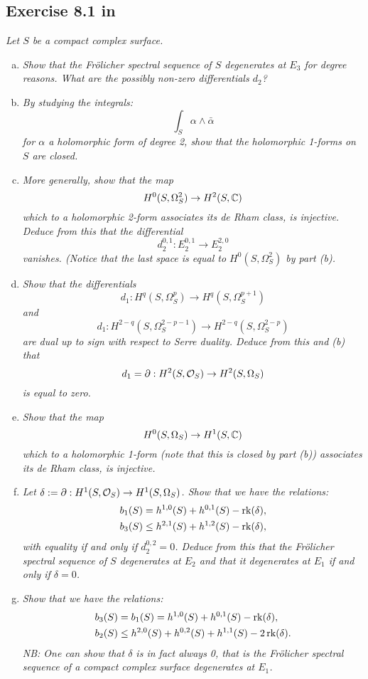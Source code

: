 \documentclass{article}
\begin{document}
\subsection*{Exercise 8.1 in \cite{Voi1}}
\emph{Let $S$ be a compact complex surface.}
\begin{enumerate}[(a)]
\item \emph{Show that the Fr\"olicher spectral sequence of $S$ degenerates at $E_3$ for degree reasons. What are
the possibly non-zero differentials $d_2$?}
\item \emph{By studying the integrals:}
\[	\int_S \alpha \wedge \bar \alpha	\]
\emph{for $\alpha$ a holomorphic form of degree 2, show that the holomorphic 1-forms on $S$ are closed.}
\item \emph{More generally, show that the map}
\[	H^0(S,\Omega^2_S) \to H^2(S,\mathbb{C})	\]
\emph{which to a holomorphic 2-form associates its de Rham class, is injective. Deduce from this that the 
differential}
\[	d_2^{0,1} : E_2^{0,1} \to E_{2}^{2,0}	\]
\emph{vanishes. (Notice that the last space is equal to $H^0(S, \Omega^2_S)$ by part (b).}
\item \emph{Show that the differentials}
\[	d_1 : H^q(S,\Omega_S^p) \to H^q(S,\Omega_S^{p+1})	\]
\emph{and}
\[	d_1 : H^{2-q}(S,\Omega_S^{2-p-1}) \to H^{2-q}(S,\Omega_S^{2-p})	\]
\emph{are dual up to sign with respect to Serre duality. Deduce from this and (b) that}
\[	d_1 = \partial : H^2(S,\mathcal{O}_S) \to H^2(S,\Omega_S)	\]
\emph{is equal to zero.}
\item \emph{Show that the map}
\[	H^0(S,\Omega_S) \to H^1(S,\mathbb{C})	\]
\emph{which to a holomorphic 1-form (note that this is closed by part (b)) associates its de Rham class, is injective.}
\item \emph{Let $\delta := \partial : H^1(S,\mathcal{O}_S) \to H^1(S,\Omega_S)$. Show that we have the relations:}
\begin{align*}
b_1(S) &= h^{1,0}(S) + h^{0,1}(S) - \operatorname{rk}(\delta), \\
b_3(S) &\leq h^{2,1}(S) + h^{1,2}(S) - \operatorname{rk}(\delta),
\end{align*}
\emph{with equality if and only if $d_2^{0,2} = 0$. Deduce from this that the Fr\"olicher spectral sequence
of $S$ degenerates at $E_2$ and that it degenerates at $E_1$ if and only if $\delta = 0$.}
\item \emph{Show that we have the relations:}
\begin{align*}
b_3(S) &= b_1(S) = h^{1,0}(S) + h^{0,1}(S) - \operatorname{rk}(\delta), \\
b_2(S) &\leq h^{2,0}(S) + h^{0,2}(S) + h^{1,1}(S) - 2\operatorname{rk}(\delta).
\end{align*}
\emph{NB: One can show that $\delta$ is in fact always 0, that is the Fr\"olicher spectral sequence of a compact
complex surface degenerates at $E_1$.}
\end{enumerate}
\end{document}
